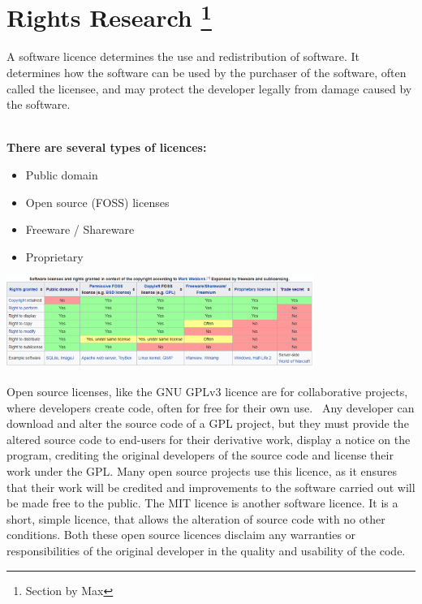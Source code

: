 \documentclass[oneside,openany,11pt,a4paper]{report}
\begin{document}
\section[Rights Research]{Rights Research \footnote{Section by Max}}
A software licence determines the use and redistribution of software. It determines how the software can be used by the purchaser of the software, often called the licensee, and may protect the developer legally from damage caused by the software.


\pagebreak 
\textbf{\\There are several types of licences:}\\
\begin{itemize}
	\itemsep0em
	\item Public domain
	\item Open source (FOSS) licenses
	\item Freeware / Shareware
	\item Proprietary
\end{itemize}
 \begin{center}{\includegraphics[width=10cm]{licence.png}}
 	\end{center}

Open source licenses, like the GNU GPLv3 licence are for collaborative projects, where developers create code, often for free for their own use.  Any developer can download and alter the source code of a GPL project, but they must provide the altered source code to end-users for their derivative work, display a notice on the program, crediting the original developers of the source code and license their work under the GPL. Many open source projects use this licence, as it ensures that their work will be credited and improvements to the software carried out will be made free to the public. The MIT licence is another software licence. It is a short, simple licence, that allows the alteration of source code with no other conditions. Both these open source licences disclaim any warranties or responsibilities of the original developer in the quality and usability of the code.
\end{document}
